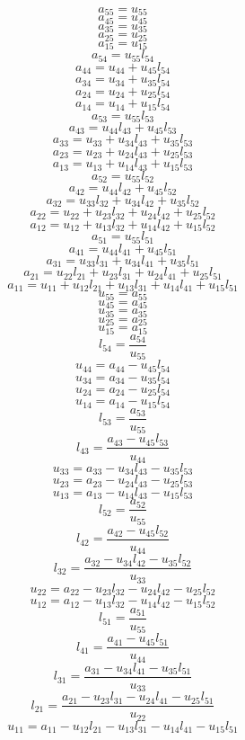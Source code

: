 \documentclass[10pt,a4paper,dvipdfmx]{article}
\begin{document}
\begin{multicols}{2}
$$ a_{{5}{5}} = u_{{5}{5}} $$
$$ a_{{4}{5}} = u_{{4}{5}} $$
$$ a_{{3}{5}} = u_{{3}{5}} $$
$$ a_{{2}{5}} = u_{{2}{5}} $$
$$ a_{{1}{5}} = u_{{1}{5}} $$
$$ a_{{5}{4}} = u_{{5}{5}} l_{{5}{4}} $$
$$ a_{{4}{4}} = u_{{4}{4}} + u_{{4}{5}} l_{{5}{4}} $$
$$ a_{{3}{4}} = u_{{3}{4}} + u_{{3}{5}} l_{{5}{4}} $$
$$ a_{{2}{4}} = u_{{2}{4}} + u_{{2}{5}} l_{{5}{4}} $$
$$ a_{{1}{4}} = u_{{1}{4}} + u_{{1}{5}} l_{{5}{4}} $$
$$ a_{{5}{3}} = u_{{5}{5}} l_{{5}{3}} $$
$$ a_{{4}{3}} = u_{{4}{4}} l_{{4}{3}} + u_{{4}{5}} l_{{5}{3}} $$
$$ a_{{3}{3}} = u_{{3}{3}} + u_{{3}{4}} l_{{4}{3}} + u_{{3}{5}} l_{{5}{3}} $$
$$ a_{{2}{3}} = u_{{2}{3}} + u_{{2}{4}} l_{{4}{3}} + u_{{2}{5}} l_{{5}{3}} $$
$$ a_{{1}{3}} = u_{{1}{3}} + u_{{1}{4}} l_{{4}{3}} + u_{{1}{5}} l_{{5}{3}} $$
$$ a_{{5}{2}} = u_{{5}{5}} l_{{5}{2}} $$
$$ a_{{4}{2}} = u_{{4}{4}} l_{{4}{2}} + u_{{4}{5}} l_{{5}{2}} $$
$$ a_{{3}{2}} = u_{{3}{3}} l_{{3}{2}} + u_{{3}{4}} l_{{4}{2}} + u_{{3}{5}} l_{{5}{2}} $$
$$ a_{{2}{2}} = u_{{2}{2}} + u_{{2}{3}} l_{{3}{2}} + u_{{2}{4}} l_{{4}{2}} + u_{{2}{5}} l_{{5}{2}} $$
$$ a_{{1}{2}} = u_{{1}{2}} + u_{{1}{3}} l_{{3}{2}} + u_{{1}{4}} l_{{4}{2}} + u_{{1}{5}} l_{{5}{2}} $$
$$ a_{{5}{1}} = u_{{5}{5}} l_{{5}{1}} $$
$$ a_{{4}{1}} = u_{{4}{4}} l_{{4}{1}} + u_{{4}{5}} l_{{5}{1}} $$
$$ a_{{3}{1}} = u_{{3}{3}} l_{{3}{1}} + u_{{3}{4}} l_{{4}{1}} + u_{{3}{5}} l_{{5}{1}} $$
$$ a_{{2}{1}} = u_{{2}{2}} l_{{2}{1}} + u_{{2}{3}} l_{{3}{1}} + u_{{2}{4}} l_{{4}{1}} + u_{{2}{5}} l_{{5}{1}} $$
$$ a_{{1}{1}} = u_{{1}{1}} + u_{{1}{2}} l_{{2}{1}} + u_{{1}{3}} l_{{3}{1}} + u_{{1}{4}} l_{{4}{1}} + u_{{1}{5}} l_{{5}{1}} $$
\vfill\null
\columnbreak
$$ u_{{5}{5}} = a_{{5}{5}} $$
$$ u_{{4}{5}} = a_{{4}{5}} $$
$$ u_{{3}{5}} = a_{{3}{5}} $$
$$ u_{{2}{5}} = a_{{2}{5}} $$
$$ u_{{1}{5}} = a_{{1}{5}} $$
$$ l_{{5}{4}} = \dfrac{a_{{5}{4}}}{u_{{5}{5}}} $$
$$ u_{{4}{4}} = a_{{4}{4}}- u_{{4}{5}} l_{{5}{4}} $$
$$ u_{{3}{4}} = a_{{3}{4}}- u_{{3}{5}} l_{{5}{4}} $$
$$ u_{{2}{4}} = a_{{2}{4}}- u_{{2}{5}} l_{{5}{4}} $$
$$ u_{{1}{4}} = a_{{1}{4}}- u_{{1}{5}} l_{{5}{4}} $$
$$ l_{{5}{3}} = \dfrac{a_{{5}{3}}}{u_{{5}{5}}} $$
$$ l_{{4}{3}} = \dfrac{a_{{4}{3}}- u_{{4}{5}} l_{{5}{3}}}{u_{{4}{4}}} $$
$$ u_{{3}{3}} = a_{{3}{3}}- u_{{3}{4}} l_{{4}{3}}- u_{{3}{5}} l_{{5}{3}} $$
$$ u_{{2}{3}} = a_{{2}{3}}- u_{{2}{4}} l_{{4}{3}}- u_{{2}{5}} l_{{5}{3}} $$
$$ u_{{1}{3}} = a_{{1}{3}}- u_{{1}{4}} l_{{4}{3}}- u_{{1}{5}} l_{{5}{3}} $$
$$ l_{{5}{2}} = \dfrac{a_{{5}{2}}}{u_{{5}{5}}} $$
$$ l_{{4}{2}} = \dfrac{a_{{4}{2}}- u_{{4}{5}} l_{{5}{2}}}{u_{{4}{4}}} $$
$$ l_{{3}{2}} = \dfrac{a_{{3}{2}}- u_{{3}{4}} l_{{4}{2}}- u_{{3}{5}} l_{{5}{2}}}{u_{{3}{3}}} $$
$$ u_{{2}{2}} = a_{{2}{2}}- u_{{2}{3}} l_{{3}{2}}- u_{{2}{4}} l_{{4}{2}}- u_{{2}{5}} l_{{5}{2}} $$
$$ u_{{1}{2}} = a_{{1}{2}}- u_{{1}{3}} l_{{3}{2}}- u_{{1}{4}} l_{{4}{2}}- u_{{1}{5}} l_{{5}{2}} $$
$$ l_{{5}{1}} = \dfrac{a_{{5}{1}}}{u_{{5}{5}}} $$
$$ l_{{4}{1}} = \dfrac{a_{{4}{1}}- u_{{4}{5}} l_{{5}{1}}}{u_{{4}{4}}} $$
$$ l_{{3}{1}} = \dfrac{a_{{3}{1}}- u_{{3}{4}} l_{{4}{1}}- u_{{3}{5}} l_{{5}{1}}}{u_{{3}{3}}} $$
$$ l_{{2}{1}} = \dfrac{a_{{2}{1}}- u_{{2}{3}} l_{{3}{1}}- u_{{2}{4}} l_{{4}{1}}- u_{{2}{5}} l_{{5}{1}}}{u_{{2}{2}}} $$
$$ u_{{1}{1}} = a_{{1}{1}}- u_{{1}{2}} l_{{2}{1}}- u_{{1}{3}} l_{{3}{1}}- u_{{1}{4}} l_{{4}{1}}- u_{{1}{5}} l_{{5}{1}} $$
\end{multicols}
\end{document}
